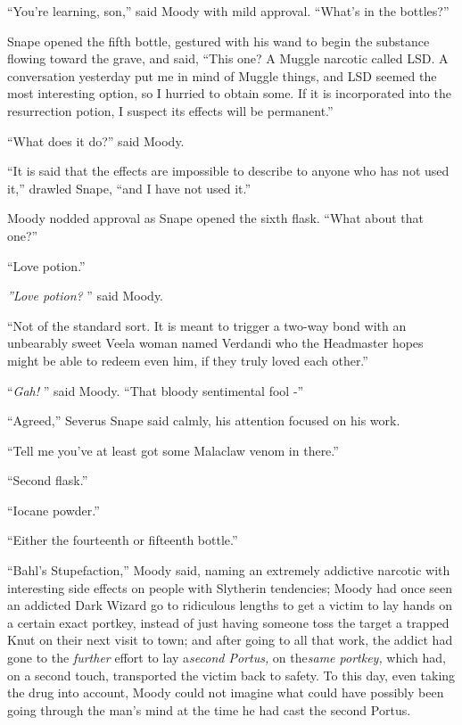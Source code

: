 ``You're learning, son,'' said Moody with mild approval. ``What's in the
bottles?''

Snape opened the fifth bottle, gestured with his wand to begin the
substance flowing toward the grave, and said, ``This one? A Muggle
narcotic called LSD. A conversation yesterday put me in mind of Muggle
things, and LSD seemed the most interesting option, so I hurried to
obtain some. If it is incorporated into the resurrection potion, I
suspect its effects will be permanent.''

``What does it do?'' said Moody.

``It is said that the effects are impossible to describe to anyone who
has not used it,'' drawled Snape, ``and I have not used it.''

Moody nodded approval as Snape opened the sixth flask. ``What about that
one?''

``Love potion.''

\emph{''Love potion?} '' said Moody.

``Not of the standard sort. It is meant to trigger a two-way bond with
an unbearably sweet Veela woman named Verdandi who the Headmaster hopes
might be able to redeem even him, if they truly loved each other.''

``\emph{Gah!} '' said Moody. ``That bloody sentimental fool -''

``Agreed,'' Severus Snape said calmly, his attention focused on his
work.

``Tell me you've at least got some Malaclaw venom in there.''

``Second flask.''

``Iocane powder.''

``Either the fourteenth or fifteenth bottle.''

``Bahl's Stupefaction,'' Moody said, naming an extremely addictive
narcotic with interesting side effects on people with Slytherin
tendencies; Moody had once seen an addicted Dark Wizard go to ridiculous
lengths to get a victim to lay hands on a certain exact portkey, instead
of just having someone toss the target a trapped Knut on their next
visit to town; and after going to all that work, the addict had gone to
the \emph{further} effort to lay a\emph{second Portus,} on the\emph{same
portkey,} which had, on a second touch, transported the victim back to
safety. To this day, even taking the drug into account, Moody could not
imagine what could have possibly been going through the man's mind at
the time he had cast the second Portus.

